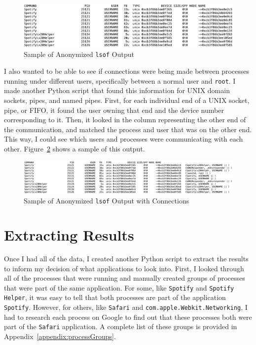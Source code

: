 \begin{figure}
\centering
\includegraphics[width=1\textwidth]{lsofAnon.png}
\caption{Sample of Anonymized \texttt{lsof} Output}
\label{fig:lsofAnon}
\end{figure}

I also wanted to be able to see if connections were being made between processes running under different users, specifically between a normal user and \texttt{root}.  I made another Python script that found this information for UNIX domain sockets, pipes, and named pipes.  First, for each individual end of a UNIX socket, pipe, or FIFO, it found the user owning that end and the device number corresponding to it.  Then, it looked in the column representing the other end of the communication, and matched the process and user that was on the other end.  This way, I could see which users and processes were communicating with each other.  Figure~\ref{fig:lsofConn} shows a sample of this output.

\begin{figure}
\centering
\includegraphics[width=1\textwidth]{lsofConn.png}
\caption{Sample of Anonymized \texttt{lsof} Output with Connections}
\label{fig:lsofConn}
\end{figure}

\section{Extracting Results}
\label{sec:extractResults}
Once I had all of the data, I created another Python script to extract the results to inform my decision of what applications to look into.  First, I  looked through all of the processes that were running and manually created groups of processes that were part of the same application.  For some, like \texttt{Spotify} and \texttt{Spotify Helper}, it was easy to tell that both processes are part of the application \texttt{Spotify}.  However, for others, like \texttt{Safari} and \texttt{com.apple.Webkit.Networking}, I had to research each process on Google to find out that these processes both were part of the \texttt{Safari} application.  A complete list of these groups is provided in Appendix~\ref{appendix:processGroups}.


